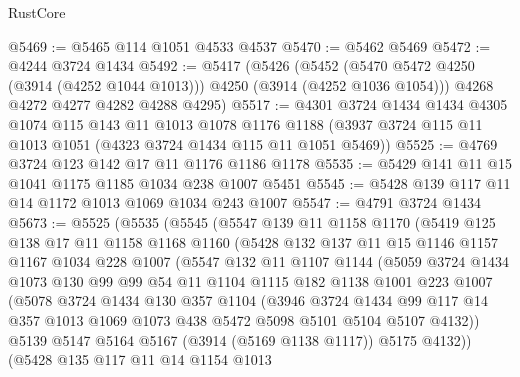 \begin{lexlean}{RustCore}
\begin{coremodule}
@5469 := @5465 @114 @1051 @4533 @4537
@5470 := @5462 @5469
@5472 := @4244 @3724 @1434
@5492 := @5417
    (@5426
      (@5452 (@5470 @5472 @4250 (@3914 (@4252 @1044 @1013))) @4250 (@3914 (@4252 @1036 @1054)))
      @4268
      @4272
      @4277
      @4282
      @4288
      @4295)
@5517 := @4301
    @3724
    @1434
    @1434
    @4305
    @1074
    @115
    @143
    @11
    @1013
    @1078
    @1176
    @1188
    (@3937 @3724 @115 @11 @1013 @1051 (@4323 @3724 @1434 @115 @11 @1051 @5469))
@5525 := @4769 @3724 @123 @142 @17 @11 @1176 @1186 @1178
@5535 := @5429 @141 @11 @15 @1041 @1175 @1185 @1034 @238 @1007 @5451
@5545 := @5428 @139 @117 @11 @14 @1172 @1013 @1069 @1034 @243 @1007
@5547 := @4791 @3724 @1434
@5673 := @5525
    (@5535
      (@5545
        (@5547
          @139
          @11
          @1158
          @1170
          (@5419
            @125
            @138
            @17
            @11
            @1158
            @1168
            @1160
            (@5428
              @132
              @137
              @11
              @15
              @1146
              @1157
              @1167
              @1034
              @228
              @1007
              (@5547
                @132
                @11
                @1107
                @1144
                (@5059
                  @3724
                  @1434
                  @1073
                  @130
                  @99
                  @99
                  @54
                  @11
                  @1104
                  @1115
                  @182
                  @1138
                  @1001
                  @223
                  @1007
                  (@5078
                    @3724
                    @1434
                    @130
                    @357
                    @1104
                    (@3946
                      @3724
                      @1434
                      @99
                      @117
                      @14
                      @357
                      @1013
                      @1069
                      @1073
                      @438
                      @5472
                      @5098
                      @5101
                      @5104
                      @5107
                      @4132))
                  @5139
                  @5147
                  @5164
                  @5167
                  (@3914 (@5169 @1138 @1117))
                  @5175
                  @4132))
              (@5428
                @135
                @117
                @11
                @14
                @1154
                @1013

\end{coremodule}
\end{lexlean}
